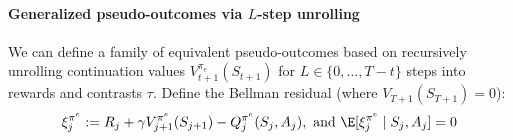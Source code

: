 \documentclass[opre,nonblindrev]{informs4}
\newenvironment{revision}{\begingroup\color{revisionblue}\ignorespaces}{\endgroup}
\newcommand{\blipadv}{\tau}
\begin{document}
\begin{revision}
\paragraph{Generalized pseudo-outcomes via $L$-step unrolling}

We can define a family of equivalent pseudo-outcomes based on recursively unrolling continuation values $V^{\pi_e}_{t+1}(S_{t+1})$ for $L\in\{0,\ldots,T-t\}$ steps into rewards and contrasts $\blipadv$.
Define the Bellman residual (where $V_{T+1}(S_{T+1})=0$):
\[
\xi_j^{\pi^e}
:=
R_j+\gamma V_{j+1}^{\pi^e}(S_{j+1})
-Q_j^{\pi^e}(S_j,A_j),
\text{ and } \E[\xi_j^{\pi^e}\mid S_j,A_j]=0
\]


\end{revision}
\end{document}
